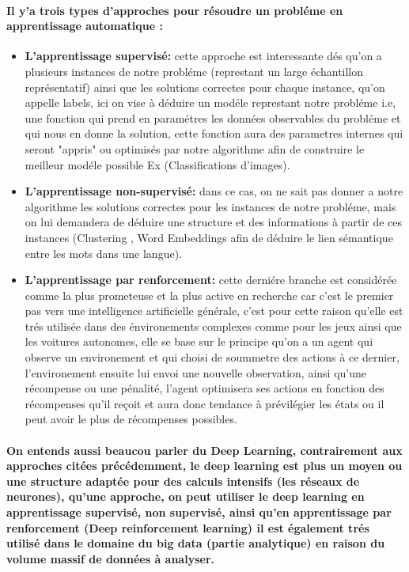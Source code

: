 \documentclass[a4paper,10pt]{article}
\begin{document}
\paragraph{
Il y'a trois types d'approches pour résoudre un probléme en apprentissage automatique :\\
}
\begin{itemize}
\item  \textbf{L'apprentissage supervisé:} cette approche est interessante dés qu'on a plusieurs instances de notre probléme (represtant un large échantillon représentatif) ainsi que les solutions correctes pour chaque instance, qu'on appelle labels, ici on vise à déduire un modéle represtant notre probléme i.e, une fonction qui prend en paramétres les données observables du probléme et qui nous en donne la solution, cette fonction aura des parametres internes qui seront "appris" ou optimisés par notre algorithme afin de construire le meilleur modéle possible Ex (Classifications d'images).
    
\item \textbf{L'apprentissage non-supervisé:} dans ce cas, on ne sait pas donner a notre algorithme les solutions correctes pour les instances de notre probléme, mais on lui demandera de déduire une structure et des informations à partir de ces instances (Clustering , Word Embeddings afin de déduire le lien sémantique entre les mots dans une langue).

\item \textbf{L'apprentissage par renforcement:} cette derniére branche est considérée comme la plus prometeuse et la plus active en recherche car c'est le premier pas vers une intelligence artificielle générale, c'est pour cette raison qu'elle est trés utilisée dans des énvironements complexes comme pour les jeux ainsi que les voitures autonomes, elle se base sur le principe qu'on a un agent qui observe un environement et qui choisi de soummetre des actions à ce dernier, l'environement ensuite lui envoi une nouvelle observation, ainsi qu'une récompense ou une pénalité, l'agent optimisera ses actions en fonction des récompenses qu'il reçoit et aura donc tendance à prévilégier les états ou il peut avoir le plus de récompenses possibles.
\end{itemize}
     

\paragraph{
On entends aussi beaucou parler du Deep Learning, contrairement aux approches citées précédemment, le deep learning est plus un moyen ou une structure adaptée pour des calculs intensifs (les réseaux de neurones), qu'une approche, on peut utiliser le deep learning en apprentissage supervisé, non supervisé, ainsi qu'en apprentissage par renforcement (Deep reinforcement learning) il est également trés utilisé dans le domaine du big data (partie analytique) en raison du volume massif de données à analyser.
}
\end{document}
